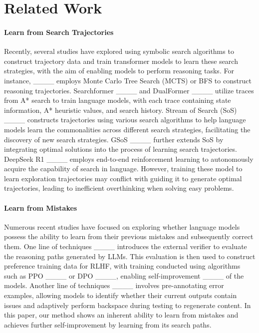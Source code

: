 \section{Related Work}
\paragraph{Learn from Search Trajectories}
Recently, several studies have explored using symbolic search algorithms to construct trajectory data and train transformer models to learn these search strategies, with the aim of enabling models to perform reasoning tasks. For instance, ____ employs Monte Carlo Tree Search (MCTS) or BFS to construct reasoning trajectories. Searchformer ____ and DualFormer ____ utilize traces from A* search to train language models, with each trace containing state information, A* heuristic values, and search history. Stream of Search (SoS) ____ constructs trajectories using various search algorithms to help language models learn the commonalities across different search strategies, facilitating the discovery of new search strategies. GSoS ____ further extends SoS by integrating optimal solutions into the process of learning search trajectories.
 DeepSeek R1 ____ employs end-to-end reinforcement learning to autonomously acquire the capability of search in language. However, training these model to learn exploration trajectories may conflict with guiding it to generate optimal trajectories, leading to inefficient overthinking when solving easy problems.

\paragraph{Learn from Mistakes}
Numerous recent studies have focused on exploring whether language models possess the ability to learn from their previous mistakes and subsequently correct them. One line of techniques ____ introduces the external verifier to evaluate the reasoning paths generated by LLMs. This evaluation is then used to construct preference training data for RLHF, with training conducted using algorithms such as PPO ____ or DPO ____, enabling self-improvement ____ of the models. Another line of techniques ____ involves pre-annotating error examples, allowing models to identify whether their current outputs contain issues and adaptively perform backspace during testing to regenerate content. In this paper, our method shows an inherent ability to learn from mistakes and achieves further self-improvement by learning from its search paths.


